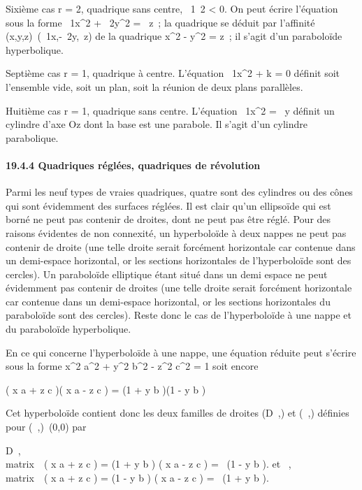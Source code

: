 Sixième cas r = 2, quadrique sans centre, \lambda~1\lambda~2
\textless{} 0. On peut écrire l'équation sous la forme
\lambda~1x^2 + \lambda~2y^2 = \beta~z~; la
quadrique se déduit par l'affinité
(x,y,z)\mapsto~(\sqrt\lambda~1x,\sqrt-\lambda~2y,\beta~z)
de la quadrique x^2 - y^2 = z~; il s'agit d'un
paraboloïde hyperbolique.

Septième cas r = 1, quadrique à centre. L'équation
\lambda~1x^2 + k = 0 définit soit l'ensemble vide, soit un
plan, soit la réunion de deux plans parallèles.

Huitième cas r = 1, quadrique sans centre. L'équation
\lambda~1x^2 = \beta~y définit un cylindre d'axe Oz dont la
base est une parabole. Il s'agit d'un cylindre parabolique.

\paragraph{19.4.4 Quadriques réglées, quadriques de révolution}

Parmi les neuf types de vraies quadriques, quatre sont des cylindres ou
des cônes qui sont évidemment des surfaces réglées. Il est clair qu'un
ellipsoïde qui est borné ne peut pas contenir de droites, dont ne peut
pas être réglé. Pour des raisons évidentes de non connexité, un
hyperboloïde à deux nappes ne peut pas contenir de droite (une telle
droite serait forcément horizontale car contenue dans un demi-espace
horizontal, or les sections horizontales de l'hyperboloïde sont des
cercles). Un paraboloïde elliptique étant situé dans un demi espace ne
peut évidemment pas contenir de droites (une telle droite serait
forcément horizontale car contenue dans un demi-espace horizontal, or
les sections horizontales du paraboloïde sont des cercles). Reste donc
le cas de l'hyperboloïde à une nappe et du paraboloïde hyperbolique.

En ce qui concerne l'hyperboloïde à une nappe, une équation réduite peut
s'écrire sous la forme  x^2 \over
a^2 + y^2 \over
b^2 - z^2 \over
c^2 = 1 soit encore

\left ( x \over a + z
\over c \right )\left (
x \over a - z \over c
\right ) = \left (1 + y
\over b \right )\left (1
- y \over b \right )

Cet hyperboloïde contient donc les deux familles de droites
(D\lambda~,\mu) et (\Delta\lambda~,\mu) définies pour
(\lambda~,\mu)\neq~(0,0) par

D\lambda~,\mu \left
\\matrix\,\lambda~\left
( x \over a + z \over c
\right ) = \mu\left (1 + y
\over b \right ) \cr
\cr \mu\left ( x \over a
- z \over c \right ) =
\lambda~\left (1 - y \over b
\right )\right .\quad
\text et \quad \Delta\lambda~,\mu
\left
\\matrix\,\lambda~\left
( x \over a + z \over c
\right ) = \mu\left (1 - y
\over b \right ) \cr
\cr \mu\left ( x \over a
- z \over c \right ) =
\lambda~\left (1 + y \over b
\right )\right .

